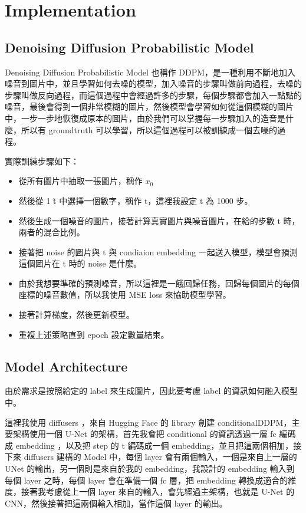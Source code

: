 
\section{Implementation}


\subsection{Denoising Diffusion Probabilistic Model}

Denoising Diffusion Probabilistic Model 也稱作 DDPM，是一種利用不斷地加入噪音到圖片中，並且學習如何去噪的模型，加入噪音的步驟叫做前向過程，去噪的步驟叫做反向過程，而這個過程中會經過許多的步驟，每個步驟都會加入一點點的噪音，最後會得到一個非常模糊的圖片，然後模型會學習如何從這個模糊的圖片中，一步一步地恢復成原本的圖片，由於我們可以掌握每一步驟加入的造音是什麼，所以有 groundtruth 可以學習，所以這個過程可以被訓練成一個去噪的過程。

實際訓練步驟如下：

\begin{itemize}
    \item 從所有圖片中抽取一張圖片，稱作 $x_0$
    \item 然後從 1 \~ t 中選擇一個數字，稱作 t，這裡我設定 t 為 1000 步。
    \item 然後生成一個噪音的圖片，接著計算真實圖片與噪音圖片，在給的步數 t 時，兩者的混合比例。
    \item 接著把 noise 的圖片與 t 與 condiaion embedding 一起送入模型，模型會預測這個圖片在 t 時的 noise 是什麼。
    \item 由於我想要準確的預測噪音，所以這裡是一餓回歸任務，回歸每個圖片的每個座標的噪音數值，所以我使用 MSE loss 來協助模型學習。
    \item 接著計算梯度，然後更新模型。
    \item 重複上述策略直到 epoch 設定數量結束。
\end{itemize}












\subsection{Model Architecture}

由於需求是按照給定的 label 來生成圖片，因此要考慮 label 的資訊如何融入模型中。

這裡我使用 diffusers ，來自 Hugging Face 的 library 創建 conditionalDDPM，主要架構使用一個 U-Net 的架構，首先我會把 conditional 的資訊透過一層 fc 編碼成 embedding ，以及把 step 的 t 編碼成一個 embedding，並且把這兩個相加，接下來 diffusers 建構的 Model 中，每個 layer 會有兩個輸入，一個是來自上一層的 UNet 的輸出，另一個則是來自於我的 embedding，我設計的 embedding 輸入到每個 layer 之時，每個 layer 會在準備一個 fc 層，把 embedding 轉換成適合的維度，接著我考慮從上一個 layer 來自的輸入，會先經過主架構，也就是 U-Net 的 CNN，然後接著把這兩個輸入相加，當作這個 layer 的輸出。

